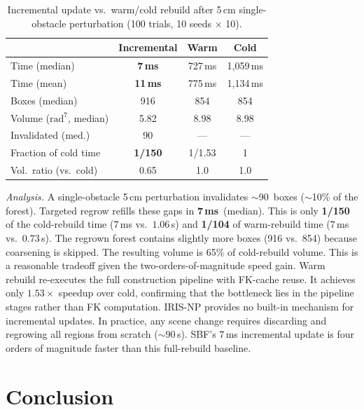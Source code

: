 \documentclass[letterpaper, conference]{IEEEtran}
\begin{document}
\begin{table}[t]
\centering
\caption{Incremental update vs.\ warm/cold rebuild after 5\,cm
  single-obstacle perturbation (100 trials, 10 seeds $\times$ 10).}
\label{tab:exp3}
\footnotesize
\begin{tabular}{@{}lccc@{}}
\toprule
  & Incremental & Warm & Cold \\
\midrule
Time (median) & \textbf{7\,ms} & 727\,ms & 1{,}059\,ms \\
Time (mean)   & \textbf{11\,ms} & 775\,ms & 1{,}134\,ms \\
Boxes (median) & 916 & 854 & 854 \\
Volume ($\text{rad}^7$, median) & 5.82 & 8.98 & 8.98 \\
Invalidated (med.) & 90 & --- & --- \\
\midrule
Fraction of cold time & \textbf{1/150} & 1/1.53 & 1 \\
Vol.\ ratio (vs.\ cold) & 0.65 & 1.0 & 1.0 \\
\bottomrule
\end{tabular}
\end{table}



\emph{Analysis.}
A single-obstacle 5\,cm perturbation invalidates $\sim$90~boxes
($\sim$10\% of the forest).
Targeted regrow refills these gaps in $\textbf{7}$\,\textbf{ms}~(median).
This is only \textbf{1/150} of the cold-rebuild time
($7$\,ms vs.\ $1.06$\,s) and \textbf{1/104} of warm-rebuild time
($7$\,ms vs.\ $0.73$\,s).
The regrown forest contains slightly more boxes (916 vs.\ 854)
because coarsening is skipped.
The resulting volume is 65\% of cold-rebuild volume.
This is a reasonable tradeoff given the two-orders-of-magnitude
speed gain.
Warm rebuild re-executes the full construction pipeline with FK-cache
reuse.
It achieves only $1.53\times$ speedup over cold, confirming that the
bottleneck lies in the pipeline stages rather than FK computation.
IRIS-NP provides no built-in mechanism for incremental updates.
In practice, any scene change requires discarding and regrowing all
regions from scratch ($\sim$90\,s).
SBF's $7$\,ms incremental update is four orders of magnitude
faster than this full-rebuild baseline.

\section{Conclusion}\label{sec:conclusion}
\end{document}
